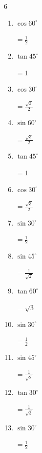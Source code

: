 \begin{multicols}{6}
\begin{enumerate}
  \item $\displaystyle \cos{60^\circ}$

        $\displaystyle =\frac{1}{2}$

  \item $\displaystyle \tan{45^\circ}$

        $\displaystyle =1$

\columnbreak %

  \item $\displaystyle \cos{30^\circ}$

        $\displaystyle =\frac{\sqrt{3}}{2}$

  \item $\displaystyle \sin{60^\circ}$

        $\displaystyle =\frac{\sqrt{3}}{2}$

  \item $\displaystyle \tan{45^\circ}$

        $\displaystyle =1$

  \item $\displaystyle \cos{30^\circ}$

        $\displaystyle =\frac{\sqrt{3}}{2}$

  \item $\displaystyle \sin{30^\circ}$

        $\displaystyle =\frac{1}{2}$

  \item $\displaystyle \sin{45^\circ}$

        $\displaystyle =\frac{1}{\sqrt{2}}$

  \item $\displaystyle \tan{60^\circ}$

        $\displaystyle =\sqrt{3}$

  \item $\displaystyle \sin{30^\circ}$

        $\displaystyle =\frac{1}{2}$

  \item $\displaystyle \sin{45^\circ}$

        $\displaystyle =\frac{1}{\sqrt{2}}$

  \item $\displaystyle \tan{30^\circ}$

        $\displaystyle =\frac{1}{\sqrt{3}}$

  \item $\displaystyle \sin{30^\circ}$

        $\displaystyle =\frac{1}{2}$


\end{enumerate}
\end{multicols}
